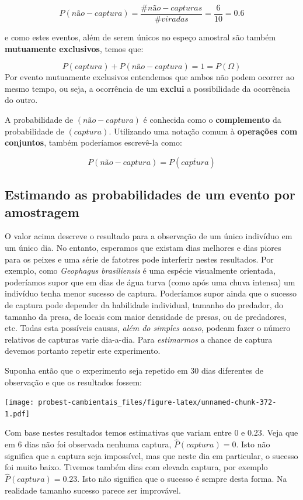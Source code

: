 \documentclass[
]{book}
\begin{document}
\[P(não-captura) = \frac{\#não-capturas}{\#viradas} = \frac{6}{10} = 0.6\]

e como estes eventos, além de serem únicos no espeço amostral são também \textbf{mutuamente exclusivos}, temos que:

\[P(captura) + P(não-captura) = 1 = P(\Omega)\]
Por evento mutuamente exclusivos entendemos que ambos não podem ocorrer ao mesmo tempo, ou seja, a ocorrência de um \textbf{exclui} a possibilidade da ocorrência do outro.

A probabilidade de \((não-captura)\) é conhecida como o \textbf{complemento} da probabilidade de \((captura)\). Utilizando uma notação comum à \textbf{operações com conjuntos}, também poderíamos escrevê-la como:

\[P(não-captura) = P(\overline{captura})\]

\hypertarget{estimando-as-probabilidades-de-um-evento-por-amostragem}{%
\subsection{Estimando as probabilidades de um evento por amostragem}\label{estimando-as-probabilidades-de-um-evento-por-amostragem}}

O valor acima descreve o resultado para a observação de um único indivíduo em um único dia. No entanto, esperamos que existam dias melhores e dias piores para os peixes e uma série de fatotres pode interferir nestes resultados. Por exemplo, como \emph{Geophagus brasiliensis} é uma espécie visualmente orientada, poderíamos supor que em dias de água turva (como após uma chuva intensa) um indivíduo tenha menor sucesso de captura. Poderíamos supor ainda que o sucesso de captura pode depender da habilidade individual, tamanho do predador, do tamanho da presa, de locais com maior densidade de presas, ou de predadores, etc. Todas esta possíveis causas, \emph{além do simples acaso}, podeam fazer o número relativos de capturas varie dia-a-dia. Para \emph{estimarmos} a chance de captura devemos portanto repetir este experimento.

Suponha então que o experimento seja repetido em 30 dias diferentes de observação e que os resultados fossem:

\texttt{[image: probest-cambientais\_files/figure-latex/unnamed-chunk-372-1.pdf]}

Com base nestes resultados temos estimativas que variam entre 0 e 0.23. Veja que em 6 dias não foi observada nenhuma captura, \(\hat{P}(captura) = 0\). Isto não significa que a captura seja impossível, mas que neste dia em particular, o sucesso foi muito baixo. Tivemos também dias com elevada captura, por exemplo \(\hat{P}(captura) = 0.23\). Isto não significa que o sucesso é sempre desta forma. Na realidade tamanho sucesso parece ser improvável.
\end{document}
